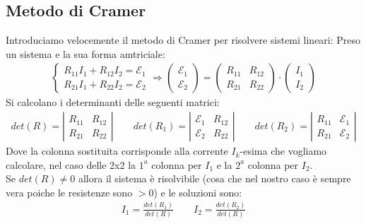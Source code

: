 \documentclass[a4paper, oneside]{article}
\begin{document}
\subsection{Metodo di Cramer}
Introduciamo velocemente il metodo di Cramer per risolvere sistemi lineari:
Preso un sistema e la sua forma amtriciale:
\begin{gather*}
    \begin{cases}
        R_{11} I_1 + R_{12} I_2 = \mathcal{E}_1\\
        R_{21} I_1 + R_{22} I_2 = \mathcal{E}_2
    \end{cases}
    \Rightarrow
    \begin{pmatrix}
        \mathcal{E}_1\\
        \mathcal{E}_2
    \end{pmatrix} = \begin{pmatrix}
        R_{11} & R_{12}\\
        R_{21} & R_{22}
    \end{pmatrix} \cdot
    \begin{pmatrix}
        I_1\\
        I_2
    \end{pmatrix}
\end{gather*}
Si calcolano i determinanti delle seguenti matrici:
\begin{gather*}
    det(R) = \left\lvert \begin{matrix}
        R_{11} & R_{12}\\
        R_{21} & R_{22}
    \end{matrix} \right\rvert \qquad
    det(R_1) = \left\lvert \begin{matrix}
        \mathcal{E}_1 & R_{12}\\
        \mathcal{E}_2 & R_{22}
    \end{matrix} \right\rvert \qquad
    det(R_2) = \left\lvert \begin{matrix}
        R_{11} & \mathcal{E}_1\\
        R_{21} & \mathcal{E}_2
    \end{matrix} \right\rvert
\end{gather*}
Dove la colonna sostituita corrisponde alla corrente $I_k$-esima che vogliamo calcolare, nel caso delle 2x2 la $1^a$ colonna per $I_1$ e la $2^a$ colonna per $I_2$.\\
Se $det(R) \neq 0$ allora il sistema è risolvibile (cosa che nel nostro caso è sempre vera poiche le resistenze sono $>0$) e le soluzioni sono:
\begin{gather*}
    I_1 = \frac{det(R_1)}{det(R)} \qquad I_2 = \frac{det(R_2)}{det(R)}
\end{gather*}
\end{document}
